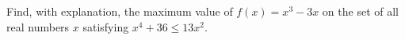 Find, with explanation, the maximum value of $f(x)=x^3-3x$ on the
set of all real numbers $x$ satisfying $x^4+36\leq 13x^2$.
